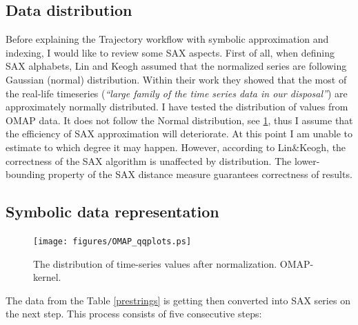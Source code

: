 \documentclass[a4paper,10pt]{article}
\numberwithin{equation}{subsection}
\begin{document}
\subsection{Data distribution}
Before explaining the Trajectory workflow with symbolic approximation and indexing, I would like to review some SAX aspects.
First of all, when defining SAX alphabets, Lin and Keogh \cite{citeulike:2821475} assumed that the normalized series are 
following Gaussian (normal) distribution. Within their work they showed that the most of the real-life timeseries 
(\textit{``large family of the time series data in our disposal''}) are approximately normally distributed. 
I have tested the distribution of values from OMAP data. It does not follow the Normal distribution, see \ref{fig:qqplots},
thus I assume that the efficiency of SAX approximation will deteriorate. At this point I am unable to estimate to which
degree it may happen. However, according to Lin\&Keogh, the correctness of the SAX algorithm is unaffected by distribution.
The lower-bounding property of the SAX distance measure guarantees correctness of results.

\subsection{Symbolic data representation}


\begin{figure}[p]
   \centering
   \texttt{[image: figures/OMAP\_qqplots.ps]}
   \caption{The distribution of time-series values after normalization. OMAP-kernel.}
   \label{fig:qqplots}
\end{figure}

The data from the Table \ref{prestrings} is getting then converted into SAX series on the next step. This process consists of 
five consecutive steps:
\end{document}
